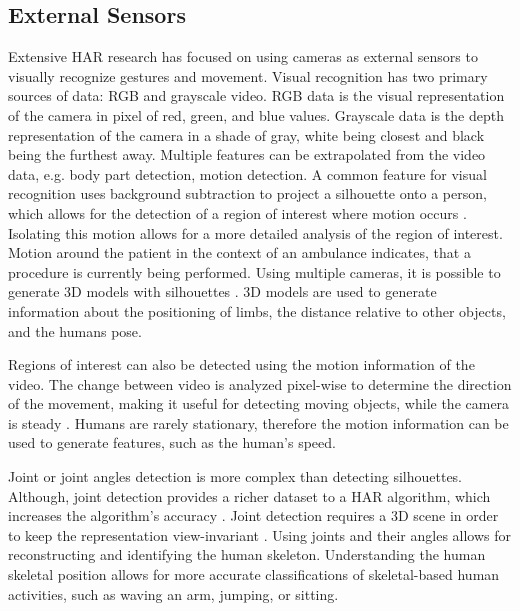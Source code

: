 \subsection{External Sensors}
Extensive \gls{HAR} research has focused on using cameras as external sensors to visually recognize gestures and movement. Visual recognition has two primary sources of data: RGB and grayscale video. RGB data is the visual representation of the camera in pixel of red, green, and blue values. Grayscale data is the depth representation of the camera in a shade of gray, white being closest and black being the furthest away. Multiple features can be extrapolated from the video data, e.g. body part detection, motion detection. A common feature for visual recognition uses background subtraction to project a silhouette onto a person, which allows for the detection of a region of interest where motion occurs \cite{Bobick2001}. Isolating this motion allows for a more detailed analysis of the region of interest. Motion around the patient in the context of an ambulance  indicates, that a procedure is currently being performed. Using multiple cameras, it is possible to generate 3D models with silhouettes \cite{Weinland2006}. 3D models are used to generate information about the positioning of limbs, the distance relative to other objects, and the humans pose.
\par Regions of interest can also be detected using the motion information of the video. The change between video is analyzed pixel-wise to determine the direction of the movement, making it useful for detecting moving objects, while the camera is steady \cite{Efros03}. Humans are rarely stationary, therefore the motion information can be used to generate features, such as the human's speed.
\par Joint or joint angles detection is more complex than detecting silhouettes. Although, joint detection provides a richer dataset to a HAR algorithm, which increases the algorithm’s accuracy \cite{CGV-005}. Joint detection requires a 3D scene in order to keep the representation view-invariant \cite{Poppe2010}. Using joints and their angles allows for reconstructing and identifying the human skeleton. Understanding the human skeletal position allows for more accurate classifications of skeletal-based human activities, such as waving an arm, jumping, or sitting.

